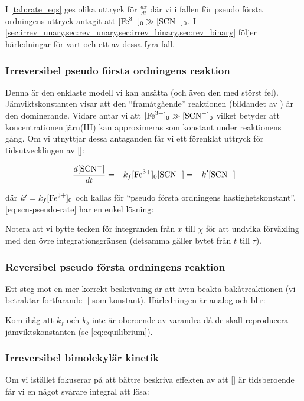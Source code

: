 

I \cref{tab:rate_eqs} ges olika uttryck för $\frac{dx}{dt}$ där vi i
fallen för pseudo första ordningens uttryck antagit att $[\ce{Fe^3+}]_0
\gg [\ce{SCN-}]_0$. I
\cref{sec:irrev_unary,sec:rev_unary,sec:irrev_binary,sec:rev_binary}
följer härledningar för vart och ett av dessa fyra fall.


\subsubsection{Irreversibel pseudo första ordningens reaktion}
\label{sec:irrev_unary}
Denna är den enklaste modell vi kan ansätta (och även den med störst fel).
Jämviktskonstanten visar att den ``framåtgående'' reaktionen (bildandet av )
är den dominerande. Vidare antar vi att $[\ce{Fe^3+}]_0 \gg [\ce{SCN-}]_0$ vilket
betyder att koncentrationen järn(III) kan approximeras som konstant under
reaktionens gång. Om vi utnyttjar dessa antaganden får vi ett förenklat
uttryck för tidsutvecklingen av []:

\begin{equation}
  \label{eq:scn-pseudo-rate}
  \frac{d[\ce{SCN-}]}{dt} = -k_f[\ce{Fe^3+}]_0[\ce{SCN-}] = -k'[\ce{SCN-}]
\end{equation}

där $k' = k_f[\ce{Fe^3+}]_0$ och kallas för ``pseudo första ordningens
hastighetskonstant''. \cref{eq:scn-pseudo-rate} har en enkel lösning: 



Notera att vi bytte tecken för integranden från $x$ till $\chi$ för att
undvika förväxling med den övre integrationsgränsen (detsamma gäller
bytet från $t$ till $\tau$).

\subsubsection{Reversibel pseudo första ordningens reaktion}
\label{sec:rev_unary}
Ett steg mot en mer korrekt beskrivning är att även beakta
bakåtreaktionen (vi betraktar fortfarande [] som
konstant). Härledningen är analog och blir:


Kom ihåg att $k_f$ och $k_b$ inte är oberoende av varandra då de skall reproducera
jämviktskonstanten (se \cref{eq:equilibrium}).

\subsubsection{Irreversibel bimolekylär kinetik}
\label{sec:irrev_binary}
Om vi istället fokuserar på att bättre beskriva effekten av att
[] är tidsberoende får vi en något svårare integral att lösa:

